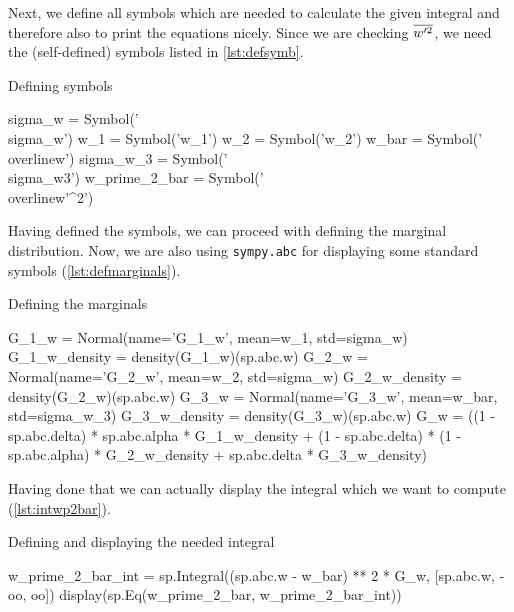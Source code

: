 Next, we define all symbols which are needed to calculate the given integral
and therefore also to print the equations nicely.
Since we are checking $\overline{w'^2}$,
we need the (self-defined) symbols listed in \cref{lst:defsymb}.
\begin{listing}[!ht]
    \caption{Defining symbols}
    \label{lst:defsymb}
    \begin{pythoncode}
        sigma_w = Symbol('\\sigma_w')
        w_1 = Symbol('w_1')
        w_2 = Symbol('w_2')
        w_bar = Symbol('\\overline{w}')
        sigma_w_3 = Symbol('\\sigma_{w3}')
        w_prime_2_bar = Symbol('\\overline{w\'^2}')
    \end{pythoncode}
\end{listing}
Having defined the symbols, we can proceed with defining the marginal distribution.
Now, we are also using \texttt{sympy.abc}
for displaying some standard symbols (\cref{lst:defmarginals}).
\begin{listing}[!ht]
    \caption{Defining the marginals}
    \label{lst:defmarginals}
    \begin{pythoncode}
        G_1_w = Normal(name='G_1_w', mean=w_1, std=sigma_w)
        G_1_w_density = density(G_1_w)(sp.abc.w)
        G_2_w = Normal(name='G_2_w', mean=w_2, std=sigma_w)
        G_2_w_density = density(G_2_w)(sp.abc.w)
        G_3_w = Normal(name='G_3_w', mean=w_bar, std=sigma_w_3)
        G_3_w_density = density(G_3_w)(sp.abc.w)
        G_w = ((1 - sp.abc.delta) * sp.abc.alpha * G_1_w_density +
               (1 - sp.abc.delta) * (1 - sp.abc.alpha) * G_2_w_density +
               sp.abc.delta * G_3_w_density)
    \end{pythoncode}
\end{listing}
Having done that
we can actually display the integral
which we want to compute (\cref{lst:intwp2bar}).
\begin{listing}[!ht]
    \caption{Defining and displaying the needed integral}
    \label{lst:intwp2bar}
    \begin{pythoncode}
        w_prime_2_bar_int = sp.Integral((sp.abc.w - w_bar) ** 2 * G_w, [sp.abc.w, -oo, oo])
        display(sp.Eq(w_prime_2_bar, w_prime_2_bar_int))
    \end{pythoncode}
\end{listing}
